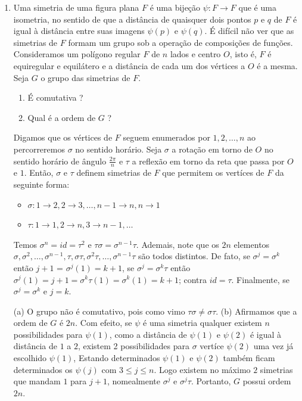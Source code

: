 \begin{exemplo}
    \leavevmode
    \begin{enumerate}[left=0.5cm, align=left, nosep]
        \item Uma simetria de uma figura plana $F$ é uma bijeção $\psi : F \to F$ que é uma isometria, no sentido de que a distância
        de quaisquer dois pontos $p$ e $q$ de $F$ é igual à distância entre suas imagens $\psi(p)$ e $\psi(q)$. É difícil não ver que
        as simetrias de $F$ formam um grupo sob a operação de composições de funções. Consideramos um polígono regular $F$ de $n$ lados
        e centro $O$, isto é, $F$ é equiregular e equilátero e a distância de cada um dos vértices a $O$ é a mesma. Seja $G$ o grupo das
        simetrias de $F$.
        \begin{enumerate}[label=(\alph*), left=0.5cm, align=left, nosep]
            \item É comutativa ?
            \item Qual é a ordem de $G$ ?
        \end{enumerate}

        Digamos que os vértices de $F$ seguem enumerados por $1,2,\ldots,n$ ao percorreremos $\sigma$ no sentido horário. Seja $\sigma$
        a rotação em torno de $O$ no sentido horário de ângulo $\frac{2\pi}{n}$ e $\tau$ a reflexão em torno da reta que passa por $O$ e $1$.
        Então, $\sigma$ e $\tau$ definem simetrias de $F$ que permitem os vertíces de $F$ da seguinte forma:
        
        \begin{itemize}[left=0.5cm, align=left, nosep]
            \item $\sigma: 1 \to 2, 2 \to 3, \ldots, n-1 \to n, n \to 1$
            \item $\tau: 1 \to 1, 2 \to n, 3 \to n-1, \ldots$
        \end{itemize}

        Temos $\sigma^n = id = \tau^2$ e $\tau \sigma = \sigma^{n-1} \tau$. Ademais, note que os $2n$ elementos $\sigma, \sigma^2, 
        \ldots, \sigma^{n-1}, \tau, \sigma\tau, \sigma^2\tau, \ldots, \sigma^{n-1}\tau$ são todos distintos. De fato, se 
        $\sigma^j = \sigma^k$ então $j+1$ = $\sigma^j(1) = k + 1$, se $\sigma^j = \sigma^k\tau$ então $\sigma^j(1) = j + 1 = 
        \sigma^k\tau(1) = \sigma^k(1) = k + 1$; contra $id = \tau$. Finalmente, se $\sigma^j = \sigma^k$ e $j = k$.
        
        (a) O grupo não é comutativo, pois como vimo $\tau \sigma \neq \sigma \tau$.
        (b) Afirmamos que a ordem de $G$ é $2n$. Com efeito, se $\psi$ é uma simetria qualquer existem $n$ possibilidades para 
        $\psi(1)$, como a distância de $\psi(1)$ e $\psi(2)$ é igual à distância de $1$ a $2$, existem 2 possibilidades para 
        $\sigma$ vertíce $\psi(2)$ uma vez já escolhido $\psi(1)$, Estando determinados $\psi(1)$ e $\psi(2)$ também ficam determinados
        os $\psi(j)$ com $3 \leq j \leq n$. Logo existem no máximo $2$ simetrias que mandam $1$ para $j + 1$, nomealmente $\sigma^j$ 
        e $\sigma^j \tau$. Portanto, $G$ possui ordem $2n$.


\end{enumerate}
\end{exemplo}

